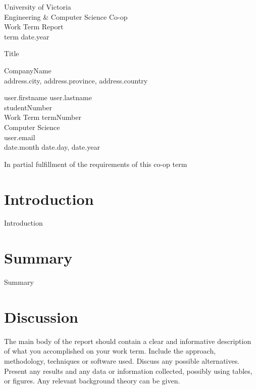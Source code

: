 \documentclass[12pt]{article}
\begin{document}
\begin{center}
    University of Victoria \\
    Engineering \& Computer Science Co-op \\
    Work Term Report \\
    {{term}} {{date.year}} \\     
    \vspace{1cm}

  {\huge {{Title}}}\\
  \vspace{1cm}

  {{CompanyName}} \\
  {{address.city}}, {{address.province}}, {{address.country}} \\      %
  \vspace{1cm}

  {{user.firstname}} {{user.lastname}} \\
  {{studentNumber}} \\
  Work Term {{termNumber}} \\                %
  Computer Science \\
  {{user.email}} \\
  {{date.month}} {{date.day}}, {{date.year}} \\              %
  \vspace{1cm}

  In partial fulfillment of the requirements of this co-op term \\


\end{center}
\newpage

\section{Introduction}
{{Introduction}}

\newpage

\section{Summary}
{{Summary}}

\newpage

\section{Discussion}
The main body of the report should contain a clear and informative description of what you accomplished on your work term. Include the approach, methodology, techniques or software used. Discuss any possible alternatives. Present any results and any data or information collected, possibly using tables, or figures. Any relevant background theory can be given.
\end{document}
